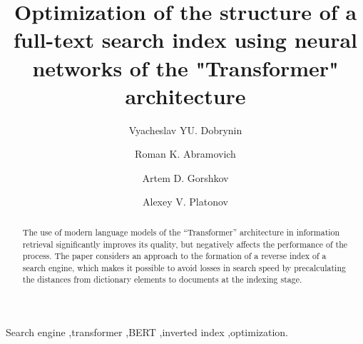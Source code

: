 \documentclass[
    twocolumn,
]{template/ceurart}
\begin{document}
    \title{Optimization of the structure of a full-text search index using neural networks of the "Transformer" architecture}
    \author[1]{Vyacheslav YU. Dobrynin}
    \author[1]{Roman K. Abramovich}
    \author[1]{Artem D. Gorshkov}
    \author[1]{Alexey V. Platonov}
    \address[1]{ITMO University, Kronverksky Pr. 49, bldg. A, Saint-Petersburg, 197101, Russian Federation}
    \begin{abstract}
        The use of modern language models of the ``Transformer'' architecture in information retrieval significantly
        improves its quality, but negatively affects the performance of the process.
        The paper considers an approach to the formation of a reverse index of a search engine,
        which makes it possible to avoid losses in search speed by precalculating the distances from dictionary
        elements to documents at the indexing stage.
    \end{abstract}
    \begin{keywords}
        Search engine \sep transformer \sep BERT \sep inverted index \sep optimization.
    \end{keywords}
    \maketitle
\end{document}
